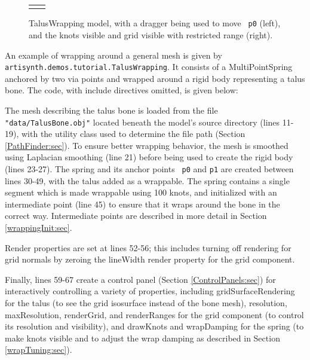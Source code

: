 \begin{figure}[t]
\begin{center}
\begin{tabular}{cc}
\fi
\end{tabular}
\end{center}
\caption{TalusWrapping model, with a dragger being used to move {\tt
p0} (left), and the knots visible and grid visible with restricted
range (right).}
\label{TalusWrapping:fig}
\end{figure}

An example of wrapping around a general mesh is given by
{\tt artisynth.demos.tutorial.TalusWrapping}.  It consists
of a MultiPointSpring anchored by two via points and wrapped around a
rigid body representing a talus bone. The code, with include
directives omitted, is given below: 
\lstset{numbers=left}
\iflatexml

\else

\fi
\lstset{numbers=none}

The mesh describing the talus bone is loaded from the file {\tt
"data/TalusBone.obj"} located beneath the model's source directory
(lines 11-19), with the utility class
 used to determine the file path
(Section \ref{PathFinder:sec}).
To ensure better wrapping behavior, the mesh is smoothed
using Laplacian smoothing (line 21) before being used to create
the rigid body (lines 23-27). The spring and its anchor points {\tt
p0} and {\tt p1} are created between lines 30-49, with the talus added
as a wrappable. The spring contains a single segment which is made
wrappable using 100 knots, and initialized with an intermediate point
(line 45) to ensure that it wraps around the bone in the correct way.
Intermediate points are described in more detail in Section
\ref{wrappingInit:sec}.

Render properties are set at lines 52-56; this includes turning off
rendering for grid normals by zeroing the {\sf lineWidth} render
property for the grid component.

Finally, lines 59-67 create a control panel (Section
\ref{ControlPanels:sec}) for interactively controlling a variety of
properties, including {\sf gridSurfaceRendering} for the talus (to see
the grid isosurface instead of the bone mesh), {\sf resolution}, {\sf
maxResolution}, {\sf renderGrid}, and {\sf renderRanges} for the grid
component (to control its resolution and visibility), and {\sf
drawKnots} and {\sf wrapDamping} for the spring (to make knots visible
and to adjust the wrap damping as described in Section
\ref{wrapTuning:sec}).


